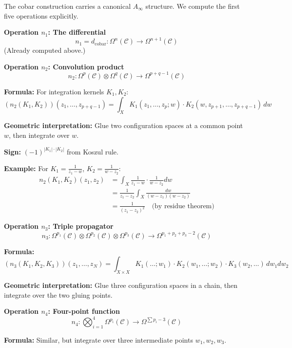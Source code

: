 \begin{example}
\label{ex:cobar-ainfty-n5}

The cobar construction carries a canonical $A_\infty$ structure. We compute the 
first five operations explicitly.

\textbf{Operation $n_1$: The differential}
$$n_1 = d_{\text{cobar}}: \Omega^n(\mathcal{C}) \to \Omega^{n+1}(\mathcal{C})$$
(Already computed above.)

\textbf{Operation $n_2$: Convolution product}
$$n_2: \Omega^p(\mathcal{C}) \otimes \Omega^q(\mathcal{C}) \to \Omega^{p+q-1}(\mathcal{C})$$

\textbf{Formula:} For integration kernels $K_1, K_2$:
$$(n_2(K_1, K_2))(z_1, \ldots, z_{p+q-1}) = \int_X K_1(z_1, \ldots, z_p; w) \cdot 
K_2(w, z_{p+1}, \ldots, z_{p+q-1}) \, dw$$

\textbf{Geometric interpretation:} Glue two configuration spaces at a common point 
$w$, then integrate over $w$.

\textbf{Sign:} $(-1)^{|K_1| \cdot |K_2|}$ from Koszul rule.

\textbf{Example:} For $K_1 = \frac{1}{z_1 - w}$, $K_2 = \frac{1}{w - z_2}$:
\begin{align*}
n_2(K_1, K_2)(z_1, z_2) &= \int_X \frac{1}{z_1 - w} \cdot \frac{1}{w - z_2} dw \\
&= \frac{1}{z_1 - z_2} \int_X \frac{dw}{(w - z_1)(w - z_2)} \\
&= \frac{1}{(z_1 - z_2)^2} \quad \text{(by residue theorem)}
\end{align*}

\textbf{Operation $n_3$: Triple propagator}
$$n_3: \Omega^{p_1}(\mathcal{C}) \otimes \Omega^{p_2}(\mathcal{C}) \otimes 
\Omega^{p_3}(\mathcal{C}) \to \Omega^{p_1+p_2+p_3-2}(\mathcal{C})$$

\textbf{Formula:}
$$(n_3(K_1, K_2, K_3))(z_1, \ldots, z_N) = \int_{X \times X} K_1(\ldots; w_1) \cdot 
K_2(w_1, \ldots; w_2) \cdot K_3(w_2, \ldots) \, dw_1 dw_2$$

\textbf{Geometric interpretation:} Glue three configuration spaces in a chain, 
then integrate over the two gluing points.

\textbf{Operation $n_4$: Four-point function}
$$n_4: \bigotimes_{i=1}^4 \Omega^{p_i}(\mathcal{C}) \to \Omega^{\sum p_i - 3}(\mathcal{C})$$

\textbf{Formula:} Similar, but integrate over three intermediate points $w_1, w_2, w_3$.


\end{example}
